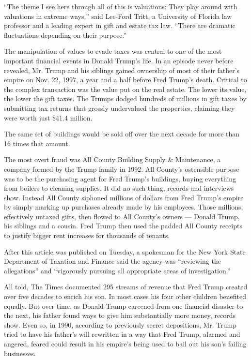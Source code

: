 ``The theme I see here through all of this is valuations: They play
around with valuations in extreme ways,'' said Lee-Ford Tritt, a
University of Florida law professor and a leading expert in gift and
estate tax law. ``There are dramatic fluctuations depending on their
purpose.''

The manipulation of values to evade taxes was central to one of the most
important financial events in Donald Trump's life. In an episode never
before revealed, Mr. Trump and his siblings gained ownership of most of
their father's empire on Nov. 22, 1997, a year and a half before Fred
Trump's death. Critical to the complex transaction was the value put on
the real estate. The lower its value, the lower the gift taxes. The
Trumps dodged hundreds of millions in gift taxes by submitting tax
returns that grossly undervalued the properties, claiming they were
worth just \$41.4 million.

The same set of buildings would be sold off over the next decade for
more than 16 times that amount.

The most overt fraud was All County Building Supply \& Maintenance, a
company formed by the Trump family in 1992. All County's ostensible
purpose was to be the purchasing agent for Fred Trump's buildings,
buying everything from boilers to cleaning supplies. It did no such
thing, records and interviews show. Instead All County siphoned millions
of dollars from Fred Trump's empire by simply marking up purchases
already made by his employees. Those millions, effectively untaxed
gifts, then flowed to All County's owners --- Donald Trump, his siblings
and a cousin. Fred Trump then used the padded All County receipts to
justify bigger rent increases for thousands of tenants.

After this article was published on Tuesday, a spokesman for the New
York State Department of Taxation and Finance said the agency was
``reviewing the allegations'' and ``vigorously pursuing all appropriate
areas of investigation.''

All told, The Times documented 295 streams of revenue that Fred Trump
created over five decades to enrich his son. In most cases his four
other children benefited equally. But over time, as Donald Trump
careened from one financial disaster to the next, his father found ways
to give him substantially more money, records show. Even so, in 1990,
according to previously secret depositions, Mr. Trump tried to have his
father's will rewritten in a way that Fred Trump, alarmed and angered,
feared could result in his empire's being used to bail out his son's
failing businesses.

